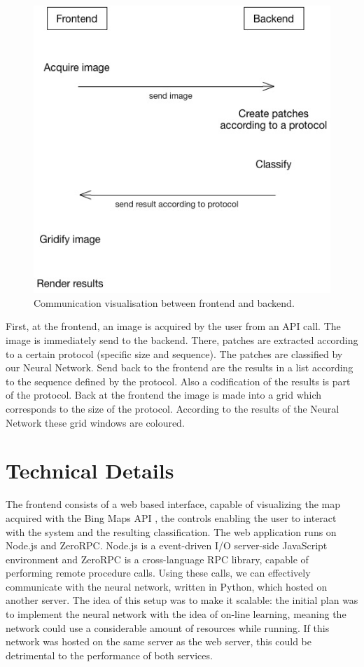 \documentclass[a4paper,onecolumn]{report}
\begin{document}
\begin{figure}[h!]
    \centering
    \includegraphics[scale=0.5]{./images/communication.jpg}
    \caption{Communication visualisation between frontend and backend.}
	\label{fig:communication}
\end{figure}
\noindent
First, at the frontend, an image is acquired by the user from an API call. The image is immediately send to the backend. There, patches are extracted according to a certain protocol (specific size and sequence). The patches are classified by our Neural Network. Send back to the frontend are the results in a list according to the sequence defined by the protocol. Also a codification of the results is part of the protocol. Back at the frontend the image is made into a grid which corresponds to the size of the protocol. According to the results of the Neural Network these grid windows are coloured.

\section{Technical Details}
The frontend consists of a web based interface, capable of visualizing the map acquired with the Bing Maps API \cite{bing}, the controls enabling the user to interact with the system and the resulting classification. The web application runs on Node.js and ZeroRPC. Node.js is a event-driven I/O server-side JavaScript environment and ZeroRPC is a cross-language RPC library, capable of performing remote procedure calls. Using these calls, we can effectively communicate with the neural network, written in Python, which hosted on another server. The idea of this setup was to make it scalable: the initial plan was to implement the neural network with the idea of on-line learning, meaning the network could use a considerable amount of resources while running. If this network was hosted on the same server as the web server, this could be detrimental to the performance of both services.
\end{document}
